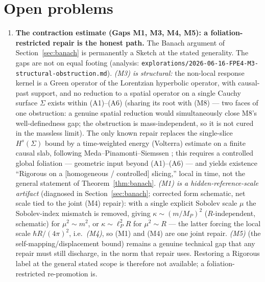 \documentclass[12pt,a4paper]{article}
\begin{document}
\section{Open problems}
\label{sec:open}

\begin{enumerate}

\item \textbf{The contraction estimate (Gaps M1, M3, M4, M5): a foliation-restricted
repair is the honest path.} The Banach argument of Section~\ref{sec:banach} is
permanently a Sketch at the stated generality. The gaps are not on equal footing
(analysis: \texttt{explorations/2026-06-16-FPE4-M3-structural-obstruction.md}).
\emph{(M3) is structural:} the non-local response kernel is a Green operator of the
Lorentzian hyperbolic operator, with causal-past support, and no reduction to a spatial
operator on a single Cauchy surface $\Sigma$ exists within (A1)--(A6) (sharing its root
with (M8) --- two faces of one obstruction: a genuine spatial reduction would simultaneously
close M8's well-definedness gap; the obstruction is mass-independent, so it is not cured
in the massless limit). The
only known repair replaces the single-slice $H^s(\Sigma)$ bound by a time-weighted energy
(Volterra) estimate on a finite causal slab, following Meda--Pinamonti--Siemssen
\cite{meda_pinamonti_siemssen,pinamonti_siemssen}; this requires a controlled global
foliation --- geometric input beyond (A1)--(A6) --- and yields existence ``Rigorous on a
[homogeneous / controlled] slicing,'' local in time, not the general statement of
Theorem~\ref{thm:banach}. \emph{(M1) is a hidden-reference-scale artifact} (diagnosed in Section~\ref{sec:banach};
corrected form schematic, net scale tied to the joint (M4) repair): with a single explicit
Sobolev scale $\mu$ the Sobolev-index mismatch is removed, giving $\kappa\sim(m/M_P)^2$
($R$-independent, schematic) for $\mu^2\sim m^2$, or $\kappa\sim\ell_P^2 R$ for
$\mu^2\sim R$ --- the latter forcing the local scale $\hbar R/(4\pi)^2$, i.e.\
\emph{(M4)}, so (M1) and (M4) are one joint repair. \emph{(M5)} (the self-mapping/displacement bound) remains a genuine technical gap
that any repair must still discharge, in the norm that repair uses. Restoring a Rigorous
label at the general stated scope is therefore not available; a foliation-restricted
re-promotion is.


\end{enumerate}
\end{document}
